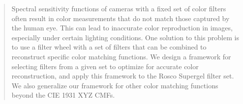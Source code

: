 \begin{abstract}\newline
Spectral sensitivity functions of cameras with a fixed set of color filters often result in color measurements that do not match those captured by the human eye. 
This can lead to inaccurate color reproduction in images, especially under certain lighting conditions.
One solution to this problem is to use a filter wheel with a set of filters that can be combined to reconstruct specific color matching functions. 
We design a framework for selecting filters from a given set to optimize for accurate color reconstruction, and apply this framework to the Rosco Supergel filter set.
We also generalize our framework for other color matching functions beyond the CIE 1931 XYZ CMFs.
\end{abstract}